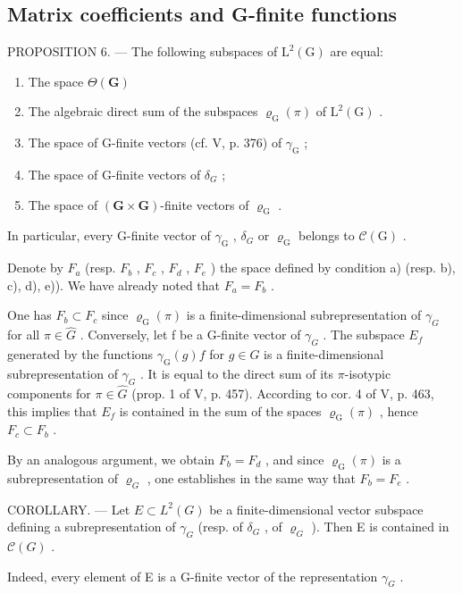 \subsection{Matrix coefficients and G-finite functions}

PROPOSITION 6. --- The following subspaces of \(\mathrm{L}^{2}(\mathrm{G})\) are equal:

\begin{enumerate}
\def\labelenumi{\alph{enumi})}
\item
  The space \(\Theta (\mathbf{G})\)
\item
  The algebraic direct sum of the subspaces \(\varrho_{\mathrm{G}}(\pi)\) of \(\mathrm{L}^2 (\mathrm{G})\) .
\item
  The space of G-finite vectors (cf. V, p. 376) of \(\gamma_{\mathrm{G}}\) ;
\item
  The space of G-finite vectors of \(\delta_{G}\) ;
\item
  The space of \((\mathbf{G} \times \mathbf{G})\)-finite vectors of \(\varrho_{\mathrm{G}}\) .
\end{enumerate}

In particular, every G-finite vector of \(\gamma_{\mathrm{G}}\) , \(\delta_{G}\) or \(\varrho_{\mathrm{G}}\) belongs to \(\mathcal{C}(\mathrm{G})\) .

Denote by \(F_{a}\) (resp. \(F_{b}\) , \(F_{c}\) , \(F_{d}\) , \(F_{e}\) ) the space defined by condition a) (resp. b), c), d), e)). We have already noted that \(F_{a} = F_{b}\) .

One has \(F_{b} \subset F_{c}\) since \(\varrho_{\mathrm{G}}(\pi)\) is a finite-dimensional subrepresentation of \(\gamma_{G}\) for all \(\pi \in \widehat{G}\) . Conversely, let f be a G-finite vector of \(\gamma_{G}\) . The subspace \(E_{f}\) generated by the functions \(\gamma_{\mathrm{G}}(g)f\) for \(g \in G\) is a finite-dimensional subrepresentation of \(\gamma_{G}\) . It is equal to the direct sum of its \(\pi\)-isotypic components for \(\pi \in \widehat{G}\) (prop. 1 of V, p. 457). According to cor. 4 of V, p. 463, this implies that \(E_{f}\) is contained in the sum of the spaces \(\varrho_{\mathrm{G}}(\pi)\) , hence \(F_{c} \subset F_{b}\) .

By an analogous argument, we obtain \(F_{b} = F_{d}\) , and since \(\varrho_{\mathrm{G}}(\pi)\) is a subrepresentation of \(\varrho_{G}\) , one establishes in the same way that \(F_{b} = F_{e}\) .

COROLLARY. --- Let \(E \subset L^{2}(G)\) be a finite-dimensional vector subspace defining a subrepresentation of \(\gamma_{G}\) (resp. of \(\delta_{G}\) , of \(\varrho_{G}\) ). Then E is contained in \(\mathcal{C}(G)\) .

Indeed, every element of E is a G-finite vector of the representation \(\gamma_{G}\) .

